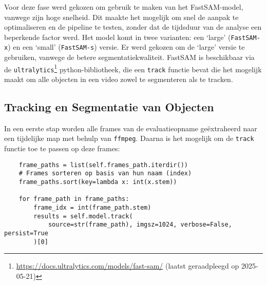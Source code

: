 Voor deze fase werd gekozen om gebruik te maken van het FastSAM-model, vanwege zijn hoge snelheid.
Dit maakte het mogelijk om snel de aanpak te optimaliseren en de pipeline te testen, zonder dat de tijdsduur van de analyse een beperkende factor werd.
Het model komt in twee varianten: een `large' (\texttt{FastSAM-x}) en een `small' (\texttt{FastSAM-s}) versie.
Er werd gekozen om de `large' versie te gebruiken, vanwege de betere segmentatiekwaliteit.
FastSAM is beschikbaar via de \texttt{ultralytics}\footnote{\url{https://docs.ultralytics.com/models/fast-sam/} (laatst geraadpleegd op 2025-05-21)} python-bibliotheek,
die een \texttt{track} functie bevat die het mogelijk maakt om alle objecten in een video zowel te segmenteren als te tracken.

\subsection{Tracking en Segmentatie van Objecten}

In een eerste stap worden alle frames van de evaluatieopname geëxtraheerd naar een tijdelijke map met behulp van \texttt{ffmpeg}.
Daarna is het mogelijk om de \texttt{track} functie toe te passen op deze frames:

\begin{listing}[H]
  \begin{verbatim}
    frame_paths = list(self.frames_path.iterdir())
    # Frames sorteren op basis van hun naam (index)
    frame_paths.sort(key=lambda x: int(x.stem))

    for frame_path in frame_paths:
        frame_idx = int(frame_path.stem)
        results = self.model.track(
            source=str(frame_path), imgsz=1024, verbose=False, persist=True
        )[0]
    \end{verbatim}
  \caption[Tracking van objecten met FastSAM]{}
\end{listing}

